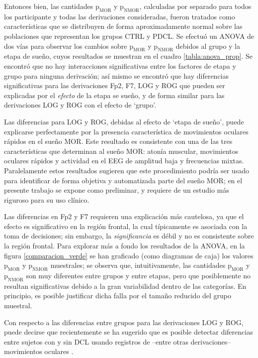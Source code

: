 \documentclass[12pt,letterpaper]{book}
\begin{document}
Entonces bien, las cantidades $\text{p}_{\text{MOR}}$ y $\text{p}_{\text{NMOR}}$, calculadas por separado para todos los participante y todas las derivaciones consideradas, fueron tratados como características que se distribuyen de forma aproximadamente normal sobre las poblaciones que representan los grupos CTRL y PDCL.
%
Se efectuó un ANOVA de dos vías para observar los cambios sobre $\text{p}_{\text{MOR}}$ y $\text{p}_{\text{NMOR}}$ debidos al grupo y la etapa de sueño, cuyos resultados se muestran en el cuadro \ref{tabla:anova_prop}.
%
Se encontró que no hay interacciones significativas entre los factores de etapa y grupo para ninguna derivación; así mismo se encontró que hay diferencias significativas para las derivaciones Fp2, F7, LOG y ROG que pueden ser explicadas por el \textit{efecto} de la etapa se sueño, y de forma similar para las derivaciones LOG y ROG con el efecto de `grupo'.

Las diferencias para LOG y ROG, debidas al efecto de `etapa de sueño', puede explicarse perfectamente por la presencia característica de movimientos oculares rápidos en el sueño MOR. 
%
Este resultado es consistente con una de las tres características que determinan al sueño MOR: atonía muscular, movimientos oculares rápidos y actividad en el EEG de amplitud baja y frecuencias mixtas.
%
Paralelamente estos resultados sugieren que este procedimiento podría ser usado para identificar de forma objetiva y automatizada parte del sueño MOR; 
en el presente trabajo se expone como preliminar, y requiere de un estudio más riguroso para su uso clínico.

Las diferencias en Fp2 y F7 requieren una explicación más cautelosa, ya que el efecto es significativo en la región frontal, la cual típicamente es asociada con la toma de decisiones; sin embargo, la \textit{significancia} es débil y no es consistente sobre la región frontal.
%
Para explorar más a fondo los resultados de la ANOVA, en la figura \ref{comparacion_verde} se han graficado (como diagramas de caja) los valores $\text{p}_{\text{MOR}}$ y $\text{p}_{\text{NMOR}}$ muestrales; se observa que, intuitivamente, las cantidades $\text{p}_{\text{MOR}}$ y $\text{p}_{\text{NMOR}}$ son muy diferentes entre grupos y entre etapas, pero que posiblemente no resultan significativas debido a la gran variabilidad dentro de las categorías.
%
En principio, es posible justificar dicha falla por el tamaño reducido del grupo muestral.

Con respecto a las diferencias entre grupos para las derivaciones LOG y ROG, puede decirse que recientemente se ha sugerido que es posible detectar diferencias entre sujetos con y sin DCL usando registros de --entre otras derivaciones-- movimientos oculares \cite{FRONTIERS}.
\end{document}
